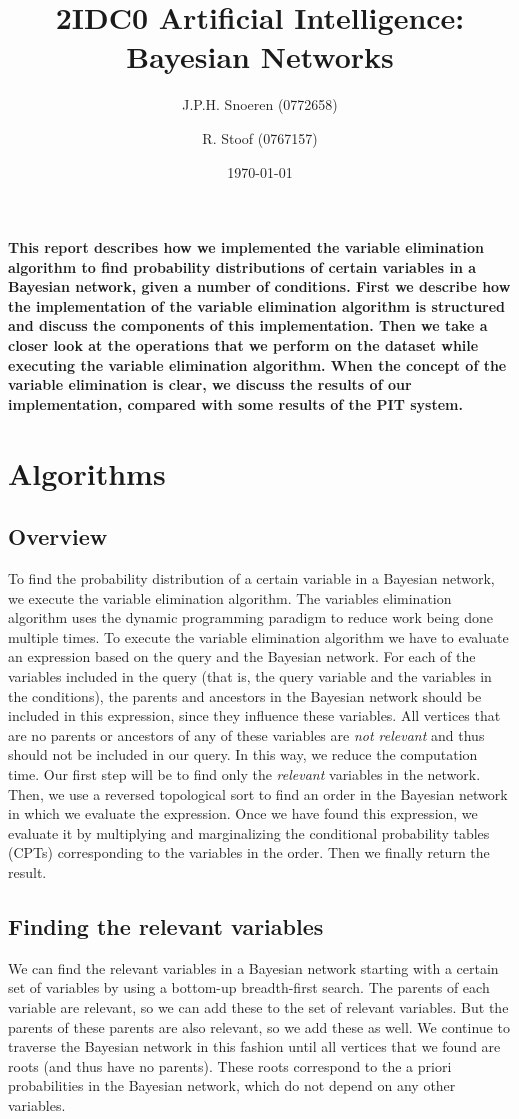 \documentclass[10pt,a4paper]{article}
\author{J.P.H. Snoeren (0772658) \and R. Stoof (0767157)}
\date{\today}
\title{2IDC0 Artificial Intelligence: Bayesian Networks}
\begin{document}
\maketitle
\textbf{This report describes how we implemented the variable elimination algorithm to find probability distributions of certain variables in a Bayesian network, given a number of conditions. First we describe how the implementation of the variable elimination algorithm is structured and discuss the components of this implementation. Then we take a closer look at the operations that we perform on the dataset while executing the variable elimination algorithm. When the concept of the variable elimination is clear, we discuss the results of our implementation, compared with some results of the PIT system.} 

\section{Algorithms}
\subsection{Overview}
To find the probability distribution of a certain variable in a Bayesian network, we execute the variable elimination algorithm. The variables elimination algorithm uses the dynamic programming paradigm to reduce work being done multiple times. To execute the variable elimination algorithm we have to evaluate an expression based on the query and the Bayesian network. For each of the variables included in the query (that is, the query variable and the variables in the conditions), the parents and ancestors in the Bayesian network should be included in this expression, since they influence these variables. All vertices that are no parents or ancestors of any of these variables are \emph{not relevant} and thus should not be included in our query. In this way, we reduce the computation time. Our first step will be to find only the \emph{relevant} variables in the network. Then, we use a reversed topological sort to find an order in the Bayesian network in which we evaluate the expression. Once we have found this expression, we evaluate it by multiplying and marginalizing the conditional probability tables (CPTs) corresponding to the variables in the order. Then we finally return the result.
\subsection{Finding the relevant variables}
We can find the relevant variables in a Bayesian network starting with a certain set of variables by using a bottom-up breadth-first search. The parents of each variable are relevant, so we can add these to the set of relevant variables. But the parents of these parents are also relevant, so we add these as well. We continue to traverse the Bayesian network in this fashion until all vertices that we found are roots (and thus have no parents). These roots correspond to the a priori probabilities in the Bayesian network, which do not depend on any other variables. 
\end{document}
